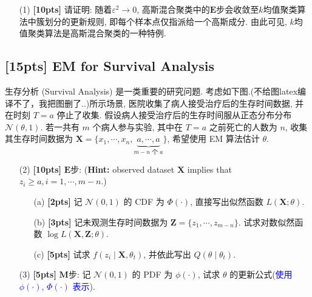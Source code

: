 \documentclass[a4paper,UTF8]{article}
\numberwithin{equation}{section}
\theoremstyle{definition}
\def \X {\mathbf{X}}
\def \Z {\mathbf{Z}}
\begin{document}
\begin{itemize}
    \item[(1)] \textbf{[10pts]} 请证明: 随着$\varepsilon^2 \to 0$, 高斯混合聚类中的$\mathbf{E}$步会收敛至$k$均值聚类算法中簇划分的更新规则, 即每个样本点仅指派给一个高斯成分. 由此可见, $k$均值聚类算法是高斯混合聚类的一种特例.
\end{itemize}

\subsection{[15pts] EM for Survival Analysis}
生存分析 (Survival Analysis) 是一类重要的研究问题. 考虑如下图.(不给图latex编译不了，我把图删了..)所示场景, 医院收集了病人接受治疗后的生存时间数据, 并在时刻 $T=a$ 停止了收集. 假设病人接受治疗后的生存时间服从正态分布分布 $\mathcal{N}(\theta, 1)$. 若一共有 $m$ 个病人参与实验, 其中在 $T=a$ 之前死亡的人数为 $n$, 收集其生存时间数据为 $\X = \{x_1, \cdots, x_n, \underbrace{a, \cdots, a}_{m-n \text{ 个 } a}\}$, 希望使用 EM 算法估计 $\theta$. 
\vskip -0.15in

    
\begin{itemize}
    \item[(2)] \textbf{[10pts]} $\mathbf{E}$步: (\textbf{Hint:} observed dataset $\X$ implies that $z_i\geq a, i=1, \cdots, m-n$.)
    \begin{itemize}
    \item[(a)] \textbf{[2pts]} 记 $\mathcal{N}(0, 1)$ 的 CDF 为 $\Phi(\cdot)$, 直接写出似然函数 $L(\X; \theta)$. 
    \item[(b)] \textbf{[3pts]} 记未观测生存时间数据为 $\Z=\{z_1, \cdots, z_{m-n}\}$. 试求对数似然函数 $\log L(\X, \Z; \theta)$. 
    \item[(c)] \textbf{[5pts]} 试求 $f(z_i\mid \X, \theta_t)$, 并依此写出 $Q(\theta\mid \theta_t)$.
    \end{itemize}
    \item[(3)] \textbf{[5pts]} $\mathbf{M}$步: 记 $\mathcal{N}(0, 1)$ 的 PDF 为 $\phi(\cdot)$, 试求 $\theta$ 的更新公式(\textcolor{blue}{使用 $\phi(\cdot)$, $\Phi(\cdot)$ 表示}).
\end{itemize}
\end{document}
